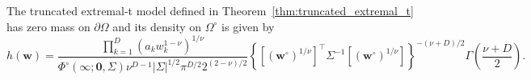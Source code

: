 \documentclass[12pt]{article}
\begin{document}
%
\begin{proposition}
\label{prop:AngDesn_eT}
The truncated extremal-t model defined in Theorem~\ref{thm:truncated_extremal_t} has zero mass on $\partial\Omega$ and its density on $\Omega^\circ$ is given by
%
\begin{equation}
\label{eq:h_eT}
h(\bm w) = \frac{\prod_{k=1}^D \left(a_k w_k^{1-\nu}\right)^{1/\nu}}{\Phi^\circ(\bm \infty;\bm 0, \Sigma) \nu^{D-1}|\Sigma|^{1/2}\pi^{D/2}2^{(2-\nu)/2}} \left\{\left[(\bm w^\circ)^{1/\nu}\right]^\top \Sigma^{-1}\left[(\bm w^\circ)^{1/\nu}\right]\right\}^{-(\nu+D)/2} \Gamma\left(\frac{\nu+D}{2}\right).
\end{equation}%
\end{proposition}

\end{document}
